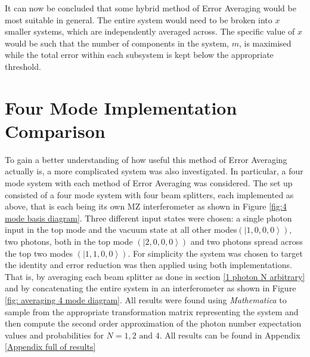 \documentclass[aps,pra,twocolumn,superscriptaddress,numerical,floatfix]{revtex4-1}
\begin{document}
It can now be concluded that some hybrid method of Error Averaging would be most suitable in general. The entire system would need to be broken into $x$ smaller systems, which are independently averaged across. The specific value of $x$ would be such that the number of components in the system, $m$, is maximised while the total error within each subsystem is kept below the appropriate threshold.

\section{Four Mode Implementation Comparison \label{Four Mode Impementation Comparison}}

To gain a better understanding of how useful this method of Error Averaging actually is, a more complicated system was also investigated. In particular, a four mode system with each method of Error Averaging was considered. The set up consisted of a four mode system with four beam splitters, each implemented as above, that is each being its own MZ interferometer as shown in Figure \ref{fig:4 mode basis diagram}. Three different input states were chosen: a single photon input in the top mode and the vacuum state at all other modes$\left(\left|1,0,0,0\right\rangle \right)$, two photons, both in the top mode $\left(\left|2,0,0,0\right\rangle \right)$ and two photons spread across the top two modes $\left(\left|1,1,0,0\right\rangle \right)$. For simplicity the system was chosen to target the identity and error reduction was then applied using both implementations. That is, by averaging each beam splitter as done in section \ref{1 photon N arbitrary} and by concatenating the entire system in an interferometer as shown in Figure \ref{fig: averaging 4 mode diagram}. All results were found using \textit{Mathematica} to sample from the appropriate transformation matrix representing the system and then compute the second order approximation of the photon number expectation values and probabilities for $N=1, 2 \textrm{ and } 4$. All results can be found in Appendix \ref{Appendix full of results}
\end{document}
